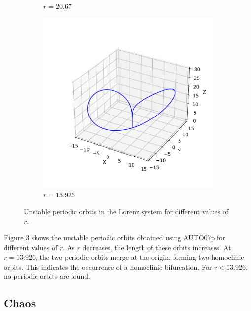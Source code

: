 \documentclass[paper=a4, fontsize=11pt]{scrartcl}
\numberwithin{equation}{section}		%
\numberwithin{figure}{section}			%
\numberwithin{table}{section}				%
\begin{document}
\begin{figure}[hbt!]
\begin{subfigure}[b]{0.495\textwidth}
		\caption{$r = 20.67$}
		\label{fig:sub2}
	\end{subfigure}
	\hfill
	\begin{subfigure}[b]{0.495\textwidth}
		\centering
		\includegraphics[width=\textwidth]{media/orbit_r_13.93.png}
		\caption{$r = 13.926$}
		\label{fig:sub2}
	\end{subfigure}
	
	\caption{Unstable periodic orbits in the Lorenz system for different values of $r$.}
	\label{fig:orbits}
\end{figure}

Figure \ref{fig:orbits} shows the unstable periodic orbits obtained using AUTO07p for different values of $r$. As $r$ decreases, the length of these orbits increases. At $r = 13.926$, the two periodic orbits merge at the origin, forming two homoclinic orbits. This indicates the occurrence of a homoclinic bifurcation. For $r < 13.926$, no periodic orbits are found.



\subsection{Chaos}
\end{document}
